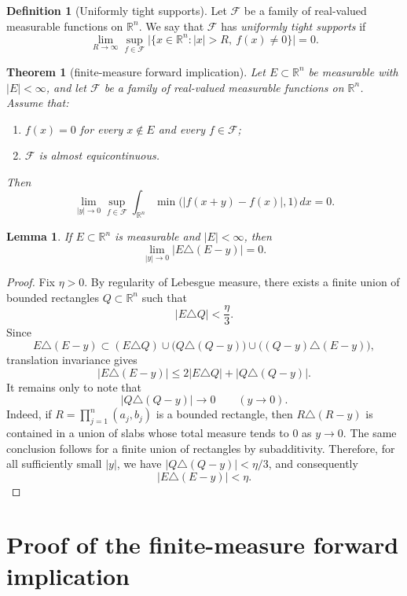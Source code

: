 \documentclass[11pt]{article}
\theoremstyle{plain}
\newtheorem{theorem}{Theorem}
\newtheorem{lemma}{Lemma}
\theoremstyle{definition}
\newtheorem{definition}{Definition}
\theoremstyle{remark}
\newcommand{\R}{\mathbb{R}}
\newcommand{\F}{\mathcal{F}}
\newcommand{\meas}[1]{\lvert #1\rvert}
\begin{document}
\begin{definition}[Uniformly tight supports]\label{def:tight-supports}
Let $\F$ be a family of real-valued measurable functions on $\R^n$. We say
that $\F$ has \emph{uniformly tight supports} if
\[
    \lim_{R\to\infty}\sup_{f\in\F}
    \meas{\{x\in\R^n: |x|>R,\ f(x)\ne0\}}=0.
\]
\end{definition}

\begin{theorem}[finite-measure forward implication]\label{thm:main}
Let $E\subset\R^n$ be measurable with $\meas{E}<\infty$, and let $\F$ be a
family of real-valued measurable functions on $\R^n$. Assume that:
\begin{enumerate}[label=\textup{(H\arabic*)},ref=\textup{(H\arabic*)}]
    \item\label{hyp:support} $f(x)=0$ for every $x\notin E$ and every
    $f\in\F$;
    \item\label{hyp:ae} $\F$ is almost equicontinuous.
\end{enumerate}
Then
\[
    \lim_{|y|\to 0}\sup_{f\in\F}
    \int_{\R^n}\min\bigl(|f(x+y)-f(x)|,1\bigr)\,dx=0.
\]
\end{theorem}

\begin{lemma}\label{lem:symdiff}
If $E\subset\R^n$ is measurable and $\meas{E}<\infty$, then
\[
    \lim_{|y|\to 0}\meas{E\triangle(E-y)}=0.
\]
\end{lemma}

\begin{proof}
Fix $\eta>0$. By regularity of Lebesgue measure, there exists a finite union
of bounded rectangles $Q\subset\R^n$ such that
\[
    \meas{E\triangle Q}<\frac{\eta}{3}.
\]
Since
\[
    E\triangle(E-y)
    \subset (E\triangle Q)\cup\bigl(Q\triangle(Q-y)\bigr)
    \cup\bigl((Q-y)\triangle(E-y)\bigr),
\]
translation invariance gives
\[
    \meas{E\triangle(E-y)}
    \le 2\meas{E\triangle Q}+\meas{Q\triangle(Q-y)}.
\]
It remains only to note that
\[
    \meas{Q\triangle(Q-y)}\longrightarrow 0
    \qquad (y\to0).
\]
Indeed, if $R=\prod_{j=1}^n(a_j,b_j)$ is a bounded rectangle, then
$R\triangle(R-y)$ is contained in a union of slabs whose total measure tends
to $0$ as $y\to0$. The same conclusion follows for a finite union of
rectangles by subadditivity. Therefore, for all sufficiently small $|y|$, we have
$\meas{Q\triangle(Q-y)}<\eta/3$, and consequently
\[
    \meas{E\triangle(E-y)}<\eta.
\]
\end{proof}

\section{Proof of the finite-measure forward implication}
\end{document}
